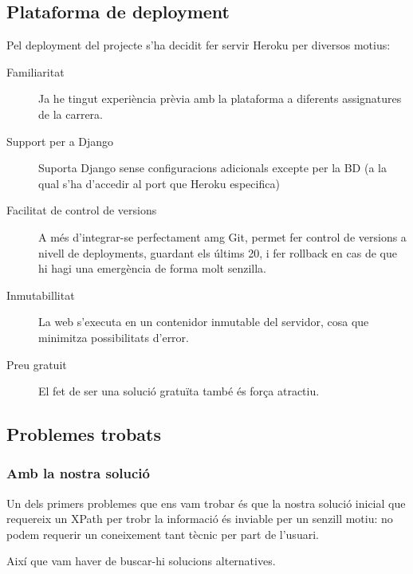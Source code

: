 \documentclass{article}
\begin{document}
\newpage

\subsection{Plataforma de deployment}

Pel deployment del projecte s'ha decidit fer servir Heroku per diversos motius:

\begin{description}
    \item[Familiaritat] Ja he tingut experiència prèvia amb la plataforma a diferents assignatures de la carrera.
    \item[Support per a Django] Suporta Django sense configuracions adicionals excepte per la BD (a la qual s'ha d'accedir al port que Heroku especifica)
    \item[Facilitat de control de versions] A més d'integrar-se perfectament amg Git, permet fer control de versions a nivell de deployments, guardant els últims 20, i fer rollback en cas de que hi hagi una emergència de forma molt senzilla.
    \item[Inmutabillitat] La web s'executa en un contenidor inmutable del servidor, cosa que minimitza possibilitats d'error.
    \item[Preu gratuit] El fet de ser una solució gratuïta també és força atractiu.
\end{description}

\newpage

\subsection{Problemes trobats}

\subsubsection{Amb la nostra solució}

Un dels primers problemes que ens vam trobar és que la nostra solució inicial que requereix un XPath per trobr la informació és inviable per un senzill motiu: no podem requerir un coneixement tant tècnic per part de l'usuari.

Així que vam haver de buscar-hi solucions alternatives.
\end{document}
